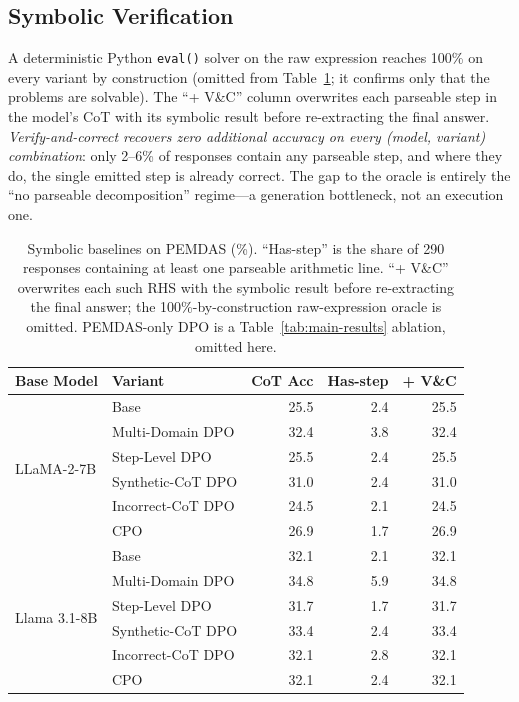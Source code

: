 \documentclass{article}
\begin{document}
\subsection{Symbolic Verification}
\label{sec:results-symbolic}

A deterministic Python \texttt{eval()} solver on the raw expression reaches 100\% on every variant by construction (omitted from Table~\ref{tab:symbolic}; it confirms only that the problems are solvable). The ``+ V\&C'' column overwrites each parseable step in the model's CoT with its symbolic result before re-extracting the final answer. \emph{Verify-and-correct recovers zero additional accuracy on every (model, variant) combination}: only 2--6\% of responses contain any parseable step, and where they do, the single emitted step is already correct. The gap to the oracle is entirely the ``no parseable decomposition'' regime---a generation bottleneck, not an execution one.

\begin{table}[h]
\centering
\caption{Symbolic baselines on PEMDAS (\%). ``Has-step'' is the share of 290 responses containing at least one parseable arithmetic line. ``+ V\&C'' overwrites each such RHS with the symbolic result before re-extracting the final answer; the 100\%-by-construction raw-expression oracle is omitted. PEMDAS-only DPO is a Table~\ref{tab:main-results} ablation, omitted here.}
\label{tab:symbolic}
\begin{tabular}{llrrr}
\toprule
Base Model & Variant & CoT Acc & Has-step & + V\&C \\
\midrule
\multirow{6}{*}{LLaMA-2-7B} & Base & 25.5 & 2.4 & 25.5 \\
 & Multi-Domain DPO & 32.4 & 3.8 & 32.4 \\
 & Step-Level DPO & 25.5 & 2.4 & 25.5 \\
 & Synthetic-CoT DPO & 31.0 & 2.4 & 31.0 \\
 & Incorrect-CoT DPO & 24.5 & 2.1 & 24.5 \\
 & CPO & 26.9 & 1.7 & 26.9 \\
\midrule
\multirow{6}{*}{Llama 3.1-8B} & Base & 32.1 & 2.1 & 32.1 \\
 & Multi-Domain DPO & 34.8 & 5.9 & 34.8 \\
 & Step-Level DPO & 31.7 & 1.7 & 31.7 \\
 & Synthetic-CoT DPO & 33.4 & 2.4 & 33.4 \\
 & Incorrect-CoT DPO & 32.1 & 2.8 & 32.1 \\
 & CPO & 32.1 & 2.4 & 32.1 \\
\bottomrule
\end{tabular}
\end{table}
\end{document}
